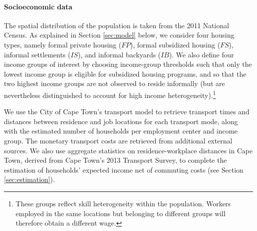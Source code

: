\documentclass[12pt]{article}
\newcommand\fnote[1]{\captionsetup{justification=raggedright,singlelinecheck=false}\caption*{#1}}
\begin{document}



\paragraph{Socioeconomic data}

The spatial distribution of the population is taken from the 2011 National Census. As explained in Section \ref{sec:model} below, we consider four housing types, namely formal private housing ($FP$), formal subsidized housing ($FS$), informal settlements ($IS$), and informal backyards ($IB$). We also define four income groups of interest by choosing income-group thresholds such that only the lowest income group is eligible for subsidized housing programs, and so that the two highest income groups are not observed to reside informally (but are nevertheless distinguished to account for high income heterogeneity).\footnote{These groups reflect skill heterogeneity within the population. Workers employed in the same locations but belonging to different groups will therefore obtain a different wage.}

We use the City of Cape Town's transport model to retrieve transport times and distances between residence and job locations for each transport mode, along with the estimated number of households per employment center and income group. The monetary transport costs are retrieved from additional external sources. We also use aggregate statistics on residence-workplace distances in Cape Town, derived from Cape Town’s 2013 Transport Survey, to complete the estimation of households' expected income net of commuting costs (see Section \ref{sec:estimation}).
\end{document}
